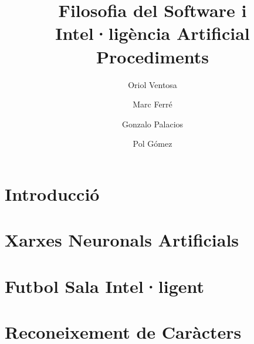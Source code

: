 \documentclass[a4paper,12pt]{report}
\date{}
\begin{document}


\title{
	{\bf Filosofia del Software i Intel·ligència Artificial} \\
	Procediments
}
\author{
	Oriol Ventosa \and
	Marc Ferré \and
	Gonzalo Palacios \and
	Pol Gómez
}

\maketitle

\tableofcontents

\chapter{Introducció}


\chapter{Xarxes Neuronals Artificials}


\chapter{Futbol Sala Intel·ligent}


\chapter{Reconeixement de Caràcters}


\printbibliography
\end{document}
